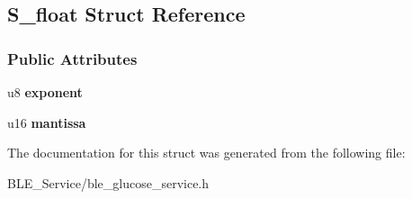 \hypertarget{struct_s__float}{}\subsection{S\+\_\+float Struct Reference}
\label{struct_s__float}
\subsubsection*{Public Attributes}
\begin{DoxyCompactItemize}
\item 
u8 {\bfseries exponent}\hypertarget{struct_s__float_aef1decf6b6b1664a6f5e6f00bed9d73d}{}\label{struct_s__float_aef1decf6b6b1664a6f5e6f00bed9d73d}

\item 
u16 {\bfseries mantissa}\hypertarget{struct_s__float_affbacc89bc4104c431c2fc1511362118}{}\label{struct_s__float_affbacc89bc4104c431c2fc1511362118}

\end{DoxyCompactItemize}


The documentation for this struct was generated from the following file\+:\begin{DoxyCompactItemize}
\item 
B\+L\+E\+\_\+\+Service/ble\+\_\+glucose\+\_\+service.\+h\end{DoxyCompactItemize}
